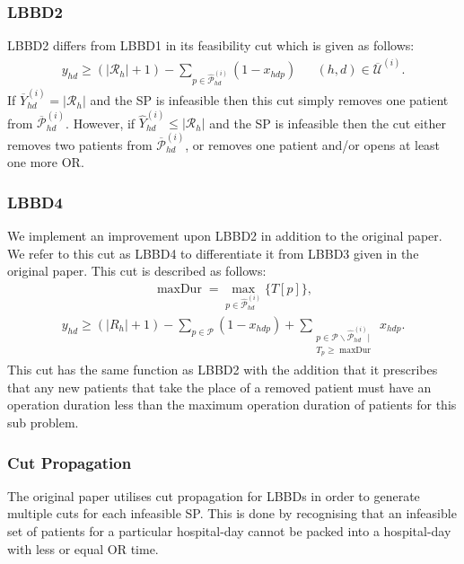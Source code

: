 \subsubsection{LBBD2}
LBBD2 differs from LBBD1 in its feasibility cut which is given as follows:
\begin{align*}
    y_{hd} \geq (|\mathcal{R}_h| + 1) - \sum\limits_{p \in \hat{\mathcal{P}}_{hd}^{(i)}}(1-x_{hdp}) && (h,d) \in \overline{\mathcal{U}}^{(i)}.
\end{align*}
If $\overline{Y}_{hd}^{(i)} = |\mathcal{R}_h|$ and the SP is infeasible then this cut simply removes one patient from $\overline{\mathcal{P}}_{hd}^{(i)}$. However, if $\hat{Y}_{hd}^{(i)} \le |\mathcal{R}_h|$ and the SP is infeasible then the cut either removes two patients from $\overline{\mathcal{P}}_{hd}^{(i)}$, or removes one patient and/or opens at least one more OR.
\subsubsection{LBBD4}
We implement an improvement upon LBBD2 in addition to the original paper. We refer to this cut as LBBD4 to differentiate it from LBBD3 given in the original paper. This cut is described as follows:
\begin{align*}
    \operatorname{maxDur} = \max\limits_{p \in \hat{\mathcal{P}}^{(i)}_{hd}}\{T[p]\},
\end{align*}
\begin{align*}
    y_{hd} \geq (|R_h| + 1) - \sum\limits_{p \in \mathcal{P}}(1-x_{hdp}) + \sum\limits_{\substack{p \in \mathcal{P}\backslash\hat{\mathcal{P}}^{(i)}_{hd} \big|\\
    T_p \geq \operatorname{maxDur}}}x_{hdp}.
\end{align*}
This cut has the same function as LBBD2 with the addition that it prescribes that any new patients that take the place of a removed patient must have an operation duration less than the maximum operation duration of patients for this sub problem.
\subsubsection{Cut Propagation}
The original paper utilises cut propagation for LBBDs in order to generate multiple cuts for each infeasible SP. This is done by recognising that an infeasible set of patients for a particular hospital-day cannot be packed into a hospital-day with less or equal OR time.
